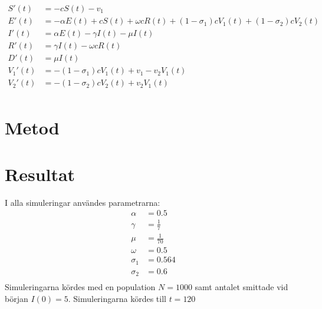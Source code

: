 \documentclass[11pt,a4paper]{article}
\begin{document}
\begin{align*}
    S'(t)   & = -c S(t) - v_1                                                                             \\
    E'(t)   & = -\alpha E(t) + c S(t) + \omega c R(t) + (1 - \sigma_1) c V_1(t) + (1 - \sigma_2) c V_2(t) \\
    I'(t)   & = \alpha E(t) - \gamma I(t) - \mu I(t)                                                      \\
    R'(t)   & = \gamma I(t) - \omega c R(t)                                                               \\
    D'(t)   & = \mu I(t)                                                                                  \\
    V_1'(t) & = -(1 - \sigma_1) c V_1(t) + v_1 - v_2 V_1(t)                                               \\
    V_2'(t) & = -(1 - \sigma_2) c V_2(t) + v_2 V_1(t)                                                     \\
\end{align*}

\section{Metod}

\section{Resultat} %
I alla simuleringar användes parametrarna:
\begin{align*}
    \alpha & = 0.5 \\ 
    \gamma & = \frac{1}{7} \\ 
    \mu & = \frac{1}{70} \\ 
    \omega & = 0.5 \\
    \sigma_1 & = 0.564 \\
    \sigma_2 & = 0.6 \\
\end{align*}
Simuleringarna kördes med en population $N=1000$ samt antalet smittade vid början $I(0)=5$. Simuleringarna kördes till $t=120$
\end{document}
